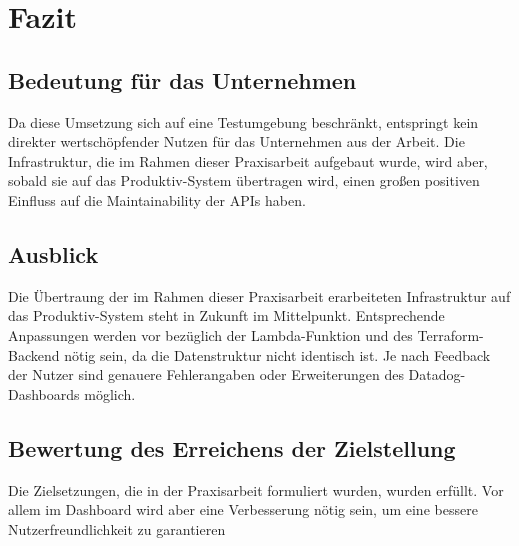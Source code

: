 \section{Fazit} 
\subsection{Bedeutung für das Unternehmen}
Da diese Umsetzung sich auf eine Testumgebung beschränkt, entspringt kein direkter wertschöpfender Nutzen für das Unternehmen aus der Arbeit. Die Infrastruktur, die im Rahmen dieser Praxisarbeit aufgebaut wurde, wird aber, sobald sie auf das Produktiv-System übertragen wird, einen großen positiven Einfluss auf die Maintainability der APIs haben. 
\subsection{Ausblick}
Die Übertraung der im Rahmen dieser Praxisarbeit erarbeiteten Infrastruktur auf das Produktiv-System steht in Zukunft im Mittelpunkt. Entsprechende Anpassungen werden vor bezüglich der Lambda-Funktion und des Terraform-Backend nötig sein, da die Datenstruktur nicht identisch ist. Je nach Feedback der Nutzer sind genauere Fehlerangaben oder Erweiterungen des Datadog-Dashboards möglich.
\subsection{Bewertung des Erreichens der Zielstellung}
Die Zielsetzungen, die in der Praxisarbeit formuliert wurden, wurden erfüllt. Vor allem im Dashboard wird aber eine Verbesserung nötig sein, um eine bessere Nutzerfreundlichkeit zu garantieren
